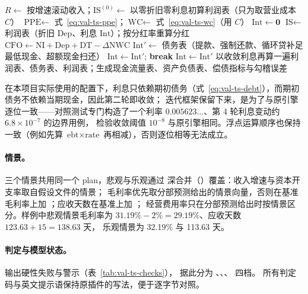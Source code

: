 \begin{algorithm}[t]
\caption{三表联动求解（）}
\label{alg:val-fixpoint}
\begin{algorithmic}[1]
\State $R\gets$ 按增速滚动收入；$\text{IS}^{(0)}\gets$ 以零折旧零利息初算利润表（只为取营业成本 $C$）
\State $\text{PPE}\gets$ 式~\eqref{eq:val-ts-ppe}；$\text{WC}\gets$ 式~\eqref{eq:val-ts-wc}（用 $C$）
\State $\text{Int}\gets \mathbf{0}$
  \State $\text{IS}\gets$ 利润表（折旧 $\text{Dep}$、利息 $\text{Int}$）；按分红率重算分红
  \State $\text{CFO}\gets \text{NI}+\text{Dep}+\text{DT}-\Delta\text{NWC}$
  \State $\text{Int}'\gets$ 债务表（提款、强制还款、循环贷补足最低现金、超额现金扫还）
   \State $\text{Int}\gets\text{Int}'$; \textbf{break} \EndIf
  \State $\text{Int}\gets\text{Int}'$
\EndFor
\State 以收敛利息再算一遍利润表、债务表、利润表；生成现金流量表、资产负债表、偿债指标与勾稽误差
\end{algorithmic}
\end{algorithm}

在本项目实际使用的配置下，利息只依赖期初债务（式~\eqref{eq:val-ts-debt}），而期初债务不依赖当期现金，因此第二轮即收敛；
迭代框架保留下来，是为了与原引擎逐位一致——对照测试专门构造了一个利率 $0.005623\ldots$、第 4 轮利息变动约 $6.8\times10^{-7}$ 的边界用例，
检验收敛阈值 $10^{-8}$ 与原引擎相同。浮点运算顺序也保持一致（例如先算 $\text{ebt}\times\text{rate}$ 再相减），否则逐位相等无法成立。

\paragraph{情景。} 三个情景共用同一个 plan，悲观与乐观通过  深合并（）覆盖：收入增速与资本开支率取自假设文件的情景；
毛利率优先取分部预测给出的情景向量，否则在基准毛利率上加 ；应收天数在基准上加 ；
经营费用率只在分部预测给出时按情景区分。样例中悲观情景毛利率为 $31.19\%-2\%=29.19\%$、应收天数 $123.63+15=138.63$ 天，
乐观情景为 32.19\% 与 113.63 天。

\paragraph{判定与模型状态。}  输出硬性失败与警示（表~\ref{tab:val-ts-checks}）， 据此分为
、、、 四档。
所有判定码与英文提示语保持原插件的写法，便于逐字节对照。

